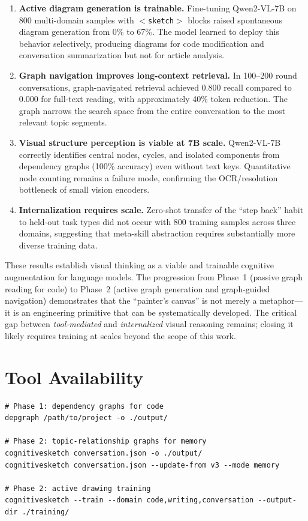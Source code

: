 \documentclass[11pt,a4paper]{article}
\begin{document}
\begin{enumerate}[nosep]
\item \textbf{Active diagram generation is trainable.} Fine-tuning Qwen2-VL-7B on 800 multi-domain samples with $<$\texttt{sketch}$>$ blocks raised spontaneous diagram generation from 0\% to 67\%. The model learned to deploy this behavior selectively, producing diagrams for code modification and conversation summarization but not for article analysis.
\item \textbf{Graph navigation improves long-context retrieval.} In 100--200 round conversations, graph-navigated retrieval achieved 0.800 recall compared to 0.000 for full-text reading, with approximately 40\% token reduction. The graph narrows the search space from the entire conversation to the most relevant topic segments.
\item \textbf{Visual structure perception is viable at 7B scale.} Qwen2-VL-7B correctly identifies central nodes, cycles, and isolated components from dependency graphs (100\% accuracy) even without text keys. Quantitative node counting remains a failure mode, confirming the OCR/resolution bottleneck of small vision encoders.
\item \textbf{Internalization requires scale.} Zero-shot transfer of the ``step back'' habit to held-out task types did not occur with 800 training samples across three domains, suggesting that meta-skill abstraction requires substantially more diverse training data.
\end{enumerate}

These results establish visual thinking as a viable and trainable cognitive augmentation for language models. The progression from Phase~1 (passive graph reading for code) to Phase~2 (active graph generation and graph-guided navigation) demonstrates that the ``painter's canvas'' is not merely a metaphor---it is an engineering primitive that can be systematically developed. The critical gap between \textit{tool-mediated} and \textit{internalized} visual reasoning remains; closing it likely requires training at scales beyond the scope of this work.


\section*{Tool Availability}

\begin{verbatim}
# Phase 1: dependency graphs for code
depgraph /path/to/project -o ./output/

# Phase 2: topic-relationship graphs for memory
cognitivesketch conversation.json -o ./output/
cognitivesketch conversation.json --update-from v3 --mode memory

# Phase 2: active drawing training
cognitivesketch --train --domain code,writing,conversation --output-dir ./training/
\end{verbatim}
\end{document}

